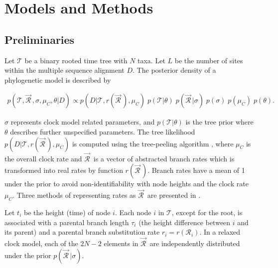 \documentclass[10pt,letterpaper]{article}
\begin{document}





\section*{Models and Methods} \label{sect:models}



\subsection*{Preliminaries}



Let $\mathcal{T}$ be a binary rooted time tree with $N$ taxa. Let $L$ be the number of sites within the multiple sequence alignment $D$. 
The posterior density of a phylogenetic model is described by

\begin{eqnarray}
\label{eq:bayesian}
p(\mathcal{T}, \vec{\mathcal{R}}^{\,}, \sigma, \mu_C, \theta|D) \propto  p(D|\mathcal{T}, r(\vec{\mathcal{R}}^{\,}), \mu_C) \; p(\mathcal{T}|\theta) \;  p(\vec{\mathcal{R}}^{\,} | \sigma) \; p(\sigma) \; p(\mu_C) \; p(\theta).
\end{eqnarray}


$\sigma$ represents clock model related parameters, and $p(\mathcal{T}|\theta)$ is the tree prior where $\theta$ describes further unspecified parameters. 
The tree likelihood $p(D|\mathcal{T}, r(\vec{\mathcal{R}}^{\,}), \mu_C)$ is computed using the tree-peeling algorithm \cite{felsenstein1981evolutionary}, where $\mu_C$ is the overall clock rate and
$\vec{\mathcal{R}}^{\,}$ is a vector of abstracted branch rates which is transformed into real rates by function $r(\vec{\mathcal{R}}^{\,})$. 
Branch rates have a mean of 1 under the prior to avoid non-identifiability with node heights and the clock rate $\mu_C$.
Three methods of representing rates as $\vec{\mathcal{R}}^{\,}$ are presented in \textbf{}.  





Let $t_i$ be the height (time) of node $i$.
Each node $i$ in $\mathcal{T}$, except for the root, is associated with a parental branch length $\tau_i$ (the height difference between $i$ and its parent)  and a parental branch substitution rate $r_i = r(\mathcal{R}_i)$. 
In a relaxed clock model, each of the $2N-2$ elements in $\vec{\mathcal{R}}^{\,}$ are independently distributed under the prior $p(\vec{\mathcal{R}}^{\,} | \sigma)$.
\end{document}
